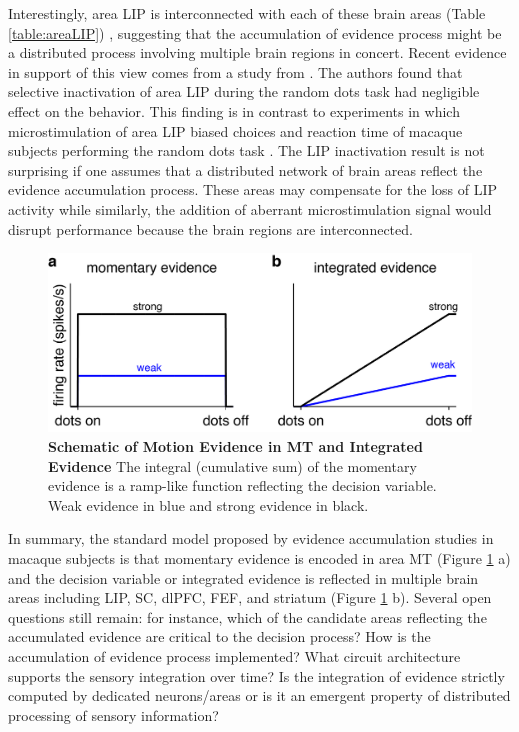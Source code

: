 Interestingly, area LIP is interconnected with each of these brain areas (Table \ref{table:areaLIP}) \parencite{Cavada1989a,Cavada1989c,Cavada1991}, suggesting that the accumulation of evidence process might be a distributed process involving multiple brain regions in concert. Recent evidence in support of this view comes from a study from \parencite{Katz2016}. The authors found that selective inactivation of area LIP during the random dots task had negligible effect on the behavior. This finding is in contrast to experiments in which microstimulation of area LIP biased choices and reaction time of macaque subjects performing the random dots task \parencite{Hanks2006}. The LIP inactivation result is not surprising if one assumes that a distributed network of brain areas reflect the evidence accumulation process. These areas may compensate for the loss of LIP activity while similarly, the addition of aberrant microstimulation signal would disrupt performance because the brain regions are interconnected.\par 
\begin{figure}
\centering
  	\includegraphics[scale=0.6]{Figures/chapter1/area_MT_LIP_activity_schematic.png}
  \caption[Schematic of Motion Evidence in MT and Integrated Evidence]{\textbf{Schematic of Motion Evidence in MT and Integrated Evidence} The integral (cumulative sum) of the momentary evidence is a ramp-like function reflecting the decision variable. Weak evidence in blue and strong evidence in black.}
   \label{fig:schematic}
\end{figure}
In summary, the standard model proposed by evidence accumulation studies in macaque subjects is that momentary evidence is encoded in area MT (Figure \ref{fig:schematic} a) and the decision variable or integrated evidence is reflected in multiple brain areas including LIP, SC, dlPFC, FEF, and striatum (Figure \ref{fig:schematic} b). Several open questions still remain: for instance, which of the candidate areas reflecting the accumulated evidence are critical to the decision process? How is the accumulation of evidence process implemented? What circuit architecture supports the sensory integration over time? Is the integration of evidence strictly computed by dedicated neurons/areas or is it an emergent property of distributed processing of sensory information?

